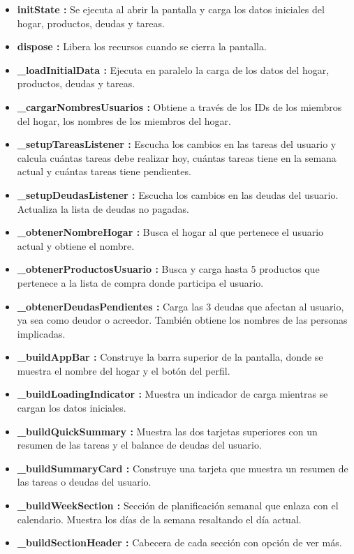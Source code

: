 \begin{itemize}
    \item \textbf{initState :} Se ejecuta al abrir la pantalla y carga los datos iniciales del hogar, productos, deudas y tareas.
    \item \textbf{dispose :} Libera los recursos cuando se cierra la pantalla.
    \item \textbf{\_loadInitialData :} Ejecuta en paralelo la carga de los datos del hogar, productos, deudas y tareas.
    \item \textbf{\_cargarNombresUsuarios :} Obtiene a través de los IDs de los miembros del hogar, los nombres de los miembros del hogar.
    \item \textbf{\_setupTareasListener :} Escucha los cambios en las tareas del usuario y calcula cuántas tareas debe realizar hoy, cuántas tareas tiene en la semana actual y cuántas tareas tiene pendientes. 
    \item \textbf{\_setupDeudasListener :} Escucha los cambios en las deudas del usuario. Actualiza la lista de deudas no pagadas.
    \item \textbf{\_obtenerNombreHogar :} Busca el hogar al que pertenece el usuario actual y obtiene el nombre.
    \item \textbf{\_obtenerProductosUsuario :} Busca y carga hasta 5 productos que pertenece a la lista de compra donde participa el usuario. 
    \item \textbf{\_obtenerDeudasPendientes :} Carga las 3 deudas que afectan al usuario, ya sea como deudor o acreedor. También obtiene los nombres de las personas implicadas.
    \item \textbf{\_buildAppBar :} Construye la barra superior de la pantalla, donde se muestra el nombre del hogar y el botón del perfil. 
    \item \textbf{\_buildLoadingIndicator : } Muestra un indicador de carga mientras se cargan los datos iniciales.
    \item \textbf{\_buildQuickSummary :} Muestra las dos tarjetas superiores con un resumen de las tareas y el balance de deudas del usuario.
    \item \textbf{\_buildSummaryCard :} Construye una tarjeta que muestra un resumen de las tareas o deudas del usuario.
    \item \textbf{\_buildWeekSection :} Sección de planificación semanal que enlaza con el calendario. Muestra los días de la semana resaltando el día actual.
    \item \textbf{\_buildSectionHeader :} Cabecera de cada sección con opción de ver más.

\end{itemize}

